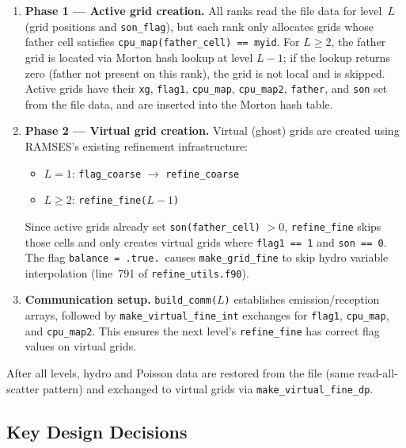 \documentclass[11pt,fleqn]{book}
\begin{document}
\begin{enumerate}
  \item \textbf{Phase 1 --- Active grid creation.}
    All ranks read the file data for level~$L$ (grid positions and \texttt{son\_flag}), but each rank only allocates grids whose father cell satisfies \texttt{cpu\_map(father\_cell) == myid}.
    For $L \geq 2$, the father grid is located via Morton hash lookup at level $L-1$; if the lookup returns zero (father not present on this rank), the grid is not local and is skipped.
    Active grids have their \texttt{xg}, \texttt{flag1}, \texttt{cpu\_map}, \texttt{cpu\_map2}, \texttt{father}, and \texttt{son} set from the file data, and are inserted into the Morton hash table.

  \item \textbf{Phase 2 --- Virtual grid creation.}
    Virtual (ghost) grids are created using RAMSES's existing refinement infrastructure:
    \begin{itemize}
      \item $L = 1$: \texttt{flag\_coarse} $\to$ \texttt{refine\_coarse}
      \item $L \geq 2$: \texttt{refine\_fine($L-1$)}
    \end{itemize}
    Since active grids already set \texttt{son(father\_cell)} $> 0$, \texttt{refine\_fine} skips those cells and only creates virtual grids where \texttt{flag1 == 1} and \texttt{son == 0}.
    The flag \texttt{balance = .true.}\ causes \texttt{make\_grid\_fine} to skip hydro variable interpolation (line~791 of \texttt{refine\_utils.f90}).

  \item \textbf{Communication setup.}
    \texttt{build\_comm($L$)} establishes emission/reception arrays, followed by
    \texttt{make\_virtual\_fine\_int} exchanges for \texttt{flag1}, \texttt{cpu\_map}, and \texttt{cpu\_map2}.
    This ensures the next level's \texttt{refine\_fine} has correct flag values on virtual grids.
\end{enumerate}

After all levels, hydro and Poisson data are restored from the file (same read-all-scatter pattern) and exchanged to virtual grids via \texttt{make\_virtual\_fine\_dp}.

\subsection{Key Design Decisions}
\end{document}
